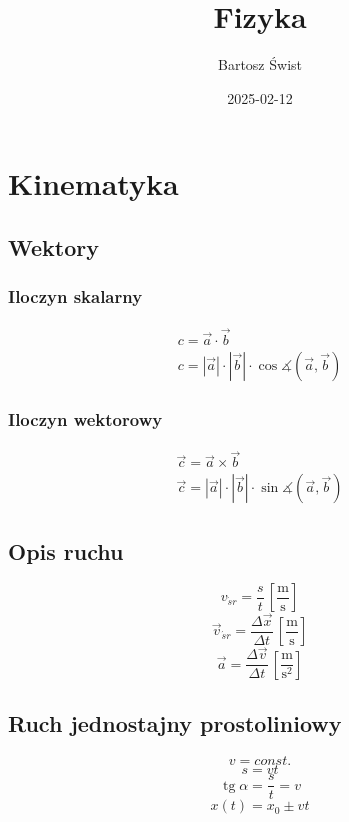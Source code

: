 \documentclass{article}
\title{Fizyka}
\date{2025-02-12}
\author{Bartosz Świst}
\numberwithin{equation}{section}
\DeclareMathOperator{\tg}{tg}
\newcommand{\unit}[1]{\, \left[\mathrm{#1}\right]}
\begin{document}
  \maketitle
  \newpage
  \section{Kinematyka}
    \subsection{Wektory}
      \subsubsection{Iloczyn skalarny}
        \begin{gather}
          c = \vec a \cdot \vec b\\
          c = |\vec a|\cdot |\vec b|\cdot\cos\measuredangle (\vec a, \vec b)
        \end{gather}
      \subsubsection{Iloczyn wektorowy}
        \begin{gather}
          \vec c = \vec a \times \vec b\\
          \vec c = |\vec a|\cdot |\vec b|\cdot\sin\measuredangle (\vec a, \vec b)
        \end{gather}
    \subsection{Opis ruchu}
      \begin{equation}
        v_{\acute sr} = \frac st \unit{\frac ms}
      \end{equation}
      \begin{equation}
        \vec v_{\acute sr} = \frac{\Delta\vec x}{\Delta t} \unit{\frac ms}
      \end{equation}
      \begin{equation}
        \vec a = \frac{\Delta\vec v}{\Delta t} \unit{\frac{m}{s^2}}
      \end{equation}
    \subsection{Ruch jednostajny prostoliniowy}
      \begin{equation}
        v = const.
      \end{equation}
      \begin{equation}
        s = vt
      \end{equation}
      \begin{equation}
        \tg\alpha = \frac st = v
      \end{equation}
      \begin{equation}
        x(t) = x_0 \pm vt
      \end{equation}
\end{document}
